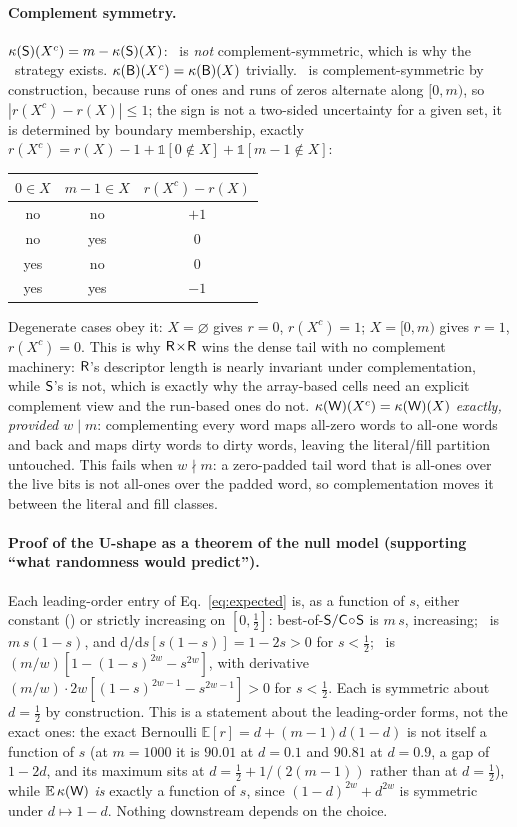 \paragraph*{Complement symmetry.}
$\kappa(\textsf{S})(X^c)=m-\kappa(\textsf{S})(X)$: \rS\ is \emph{not} complement-symmetric, which is why the \rC\
strategy exists. $\kappa(\textsf{B})(X^c)=\kappa(\textsf{B})(X)$ trivially. \rR\ is complement-symmetric by
construction, because runs of ones and runs of zeros alternate along $[0,m)$, so
$|r(X^c)-r(X)|\le1$; the sign is not a two-sided uncertainty for a given set, it is determined by
boundary membership, exactly $r(X^c)=r(X)-1+\mathbb{1}[0\notin X]+\mathbb{1}[m-1\notin X]$:

\begin{center}
\begin{tabular}{ccc}
\toprule
$0\in X$ & $m-1\in X$ & $r(X^c)-r(X)$ \\
\midrule
no & no & $+1$ \\
no & yes & $0$ \\
yes & no & $0$ \\
yes & yes & $-1$ \\
\bottomrule
\end{tabular}
\end{center}

Degenerate cases obey it: $X=\varnothing$ gives $r=0$, $r(X^c)=1$; $X=[0,m)$ gives $r=1$, $r(X^c)=0$.
This is why $\textsf{R}\!\times\!\textsf{R}$ wins the dense tail with no complement machinery: $\textsf{R}$'s descriptor
length is nearly invariant under complementation, while $\textsf{S}$'s is not, which is exactly why the
array-based cells need an explicit complement view and the run-based ones do not.
$\kappa(\textsf{W})(X^c)=\kappa(\textsf{W})(X)$ \emph{exactly, provided $w\mid m$}: complementing every word maps
all-zero words to all-one words and back and maps dirty words to dirty words, leaving the
literal/fill partition untouched. This fails when $w\nmid m$: a zero-padded tail word that is
all-ones over the live bits is not all-ones over the padded word, so complementation moves it between
the literal and fill classes.

\paragraph*{Proof of the U-shape as a theorem of the null model (supporting ``what randomness would
predict'').}
Each leading-order entry of Eq.~\eqref{eq:expected} is, as a function of $s$, either constant (\rB) or
strictly increasing on $[0,\tfrac12]$: best-of-$\textsf{S}/\textsf{C}\!\circ\!\textsf{S}$ is $m\,s$, increasing; \rR\ is
$m\,s(1-s)$, and $\mathrm{d}/\mathrm{d}s[s(1-s)]=1-2s>0$ for $s<\tfrac12$; \rW\ is
$(m/w)[1-(1-s)^{2w}-s^{2w}]$, with derivative $(m/w)\cdot2w[(1-s)^{2w-1}-s^{2w-1}]>0$ for $s<\tfrac12$.
Each is symmetric about $d=\tfrac12$ by construction. This is a statement about the
leading-order forms, not the exact ones: the exact Bernoulli $\mathbb{E}[r]=d+(m-1)d(1-d)$ is not
itself a function of $s$ (at $m=1000$ it is $90.01$ at $d=0.1$ and $90.81$ at $d=0.9$, a gap of
$1-2d$, and its maximum sits at $d=\tfrac12+1/(2(m-1))$ rather than at $d=\tfrac12$), while
$\mathbb{E}\,\kappa(\textsf{W})$ \emph{is} exactly a function of $s$, since $(1-d)^{2w}+d^{2w}$ is symmetric
under $d\mapsto1-d$. Nothing downstream depends on the choice.

